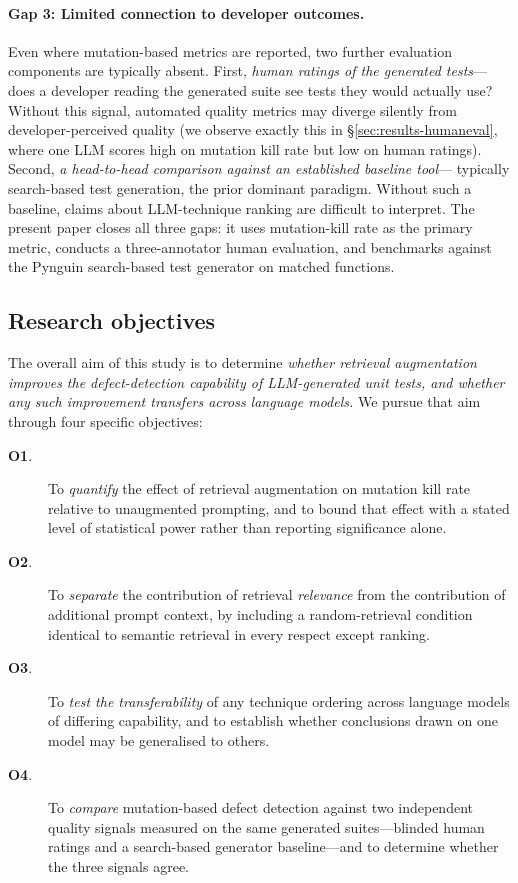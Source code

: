 \documentclass[smallextended]{svjour3}
\begin{document}
\paragraph{Gap 3: Limited connection to developer outcomes.}
Even where mutation-based metrics are reported, two further
evaluation components are typically absent. First, \emph{human
ratings of the generated tests}—does a developer reading the
generated suite see tests they would actually use? Without this
signal, automated quality metrics may diverge silently from
developer-perceived quality (we observe exactly this in
\S\ref{sec:results-humaneval}, where one LLM scores high on mutation
kill rate but low on human ratings). Second, \emph{a head-to-head
comparison against an established baseline tool}—
typically search-based test generation, the prior dominant paradigm. Without
such a baseline, claims about LLM-technique ranking are difficult to
interpret. The present paper closes all three gaps: it uses
mutation-kill rate as the primary metric, conducts a three-annotator
human evaluation, and benchmarks against the Pynguin search-based
test generator on matched functions.

\subsection{Research objectives}\label{sec:intro-objectives}

The overall aim of this study is to determine \emph{whether
retrieval augmentation improves the defect-detection capability of
LLM-generated unit tests, and whether any such improvement transfers
across language models.} We pursue that aim through four specific
objectives:

\begin{description}
\item[\textbf{O1}.] To \emph{quantify} the effect of retrieval
 augmentation on mutation kill rate relative to unaugmented
 prompting, and to bound that effect with a stated level of
 statistical power rather than reporting significance alone.
\item[\textbf{O2}.] To \emph{separate} the contribution of retrieval
 \emph{relevance} from the contribution of additional prompt
 context, by including a random-retrieval condition identical to
 semantic retrieval in every respect except ranking.
\item[\textbf{O3}.] To \emph{test the transferability} of any technique
 ordering across language models of differing capability, and to
 establish whether conclusions drawn on one model may be
 generalised to others.
\item[\textbf{O4}.] To \emph{compare} mutation-based defect detection
 against two independent quality signals measured on the same
 generated suites---blinded human ratings and a search-based
 generator baseline---and to determine whether the three signals
 agree.
\end{description}
\end{document}
